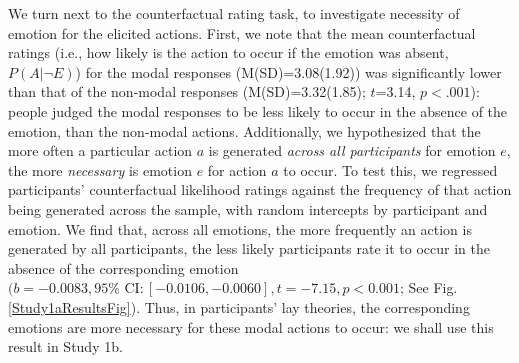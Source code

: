 \documentclass[10pt,letterpaper]{article}
\newcommand{\ndg}[1]{\textcolor{Green}{[ndg: #1]}}
\begin{document}
We turn next to the counterfactual rating task, to investigate necessity of emotion for the elicited actions. 
First, we note that the mean counterfactual ratings (i.e., how likely is the action to occur if the emotion was absent, $P(A | \neg E)$) for the modal responses (M(SD)=3.08(1.92)) was significantly lower than that of the non-modal responses (M(SD)=3.32(1.85); $t$=3.14, $p<.001$): people judged the modal responses to be less likely to occur in the absence of the emotion, than the non-modal actions.
Additionally, we hypothesized that the more often a particular action $a$ is generated \textit{across all participants} for emotion $e$, the more \textit{necessary} is emotion $e$ for action $a$ to occur.
To test this, we regressed participants' counterfactual likelihood ratings against the frequency of that action being generated across the sample, with random intercepts by participant and emotion. 
We find that, across all emotions, the more frequently an action is generated by all participants, the less likely participants rate it to occur in the absence of the corresponding emotion $(b = -0.0083, 95\% \text{ CI}: [-0.0106, -0.0060], t=-7.15, p<0.001$; See Fig. \ref{Study1aResultsFig}). 
Thus, in participants' lay theories, the corresponding emotions are more necessary for these modal actions to occur: we shall use this result in Study 1b.
\end{document}
